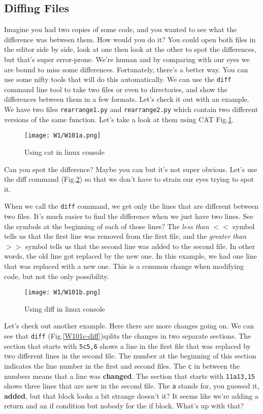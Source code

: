 	\subsection{Diffing Files}
	Imagine you had two copies of some code, and you wanted to see what the difference was between them. How would you do it? You could open both files in the editor side by side, look at one then look at the other to spot the differences, but that's super error-prone. We're human and by comparing with our eyes we are bound to miss some differences. Fortunately, there's a better way. You can use some nifty tools that will do this automatically. We can use the \texttt{diff} command line tool to take two files or even to directories, and show the differences between them in a few formats. Let's check it out with an example. We have two files \texttt{rearrange1.py} and \texttt{rearrange2.py} which contain two different versions of the same function. Let's take a look at them using CAT Fig.\ref{W101a-cat}.

\begin{figure} 
	\caption{Using cat in linux console}
	\centering
	\texttt{[image: W1/W101a.png]}
	\label{W101a-cat}
\end{figure}

	Can you spot the difference? Maybe you can but it's not super obvious. Let's use the diff command (Fig.\ref{W101b-diff}) so that we don't have to strain our eyes trying to spot it.

	When we call the \texttt{diff} command, we get only the lines that are different between two files. It's much easier to find the difference when we just have two lines. See the symbols at the beginning of each of those lines? The \textit{less than} $<<$ symbol tells us that the first line was removed from the first file, and the \textit{greater than} $>>$ symbol tells us that the second line was added to the second file. In other words, the old line got replaced by the new one. In this example, we had one line that was replaced with a new one. This is a common change when modifying code, but not the only possibility. 
	
	
	\begin{figure} 
		\caption{Using diff in linux console}
		\centering
		\texttt{[image: W1/W101b.png]}
		\label{W101b-diff}
	\end{figure}	
	
	
	Let's check out another example. Here there are more changes going on.
	We can see that \texttt{diff} (Fig.\ref{W101c-diff})splits the changes in two separate sections. The section that starts with \texttt{5c5,6} shows a line in the first file that was replaced by two different lines in the second file. The number at the beginning of this section indicates the line number in the first and second files. The \texttt{c} in between the numbers means that a line was \textbf{changed}. The section that starts with \texttt{11a13,15} shows three lines that are new in the second file. The \texttt{a} stands for, you guessed it, \textbf{added}, but that block looks a bit strange doesn't it? It seems like we're adding a return and an if condition but nobody for the if block. What's up with that? 
	
